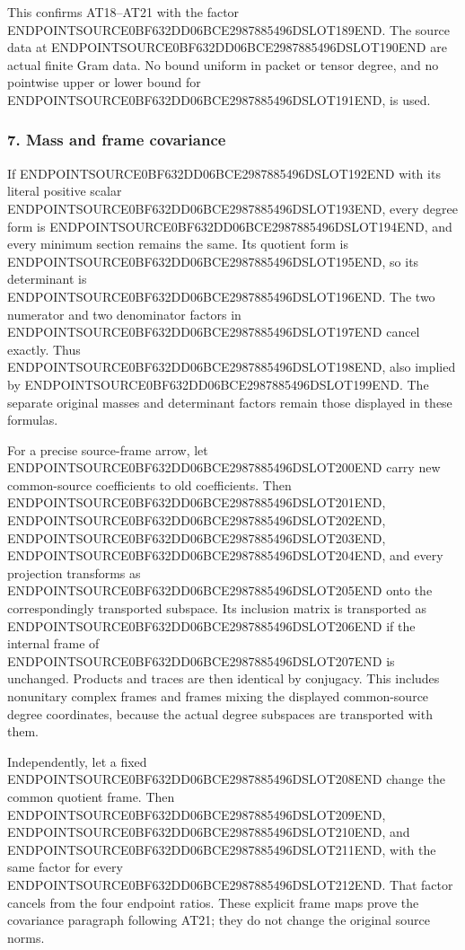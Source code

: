 This confirms AT18--AT21 with the factor ENDPOINTSOURCE0BF632DD06BCE2987885496DSLOT189END. The source data at ENDPOINTSOURCE0BF632DD06BCE2987885496DSLOT190END are actual finite Gram data. No bound uniform in packet or tensor degree, and no pointwise upper or lower bound for ENDPOINTSOURCE0BF632DD06BCE2987885496DSLOT191END, is used.

\subsubsection{7. Mass and frame covariance}\label{endpoint-determinant_review--mass-and-frame-covariance}

If ENDPOINTSOURCE0BF632DD06BCE2987885496DSLOT192END with its literal positive scalar ENDPOINTSOURCE0BF632DD06BCE2987885496DSLOT193END, every degree form is ENDPOINTSOURCE0BF632DD06BCE2987885496DSLOT194END, and every minimum section remains the same. Its quotient form is ENDPOINTSOURCE0BF632DD06BCE2987885496DSLOT195END, so its determinant is ENDPOINTSOURCE0BF632DD06BCE2987885496DSLOT196END. The two numerator and two denominator factors in ENDPOINTSOURCE0BF632DD06BCE2987885496DSLOT197END cancel exactly. Thus ENDPOINTSOURCE0BF632DD06BCE2987885496DSLOT198END, also implied by ENDPOINTSOURCE0BF632DD06BCE2987885496DSLOT199END. The separate original masses and determinant factors remain those displayed in these formulas.

For a precise source-frame arrow, let ENDPOINTSOURCE0BF632DD06BCE2987885496DSLOT200END carry new common-source coefficients to old coefficients. Then ENDPOINTSOURCE0BF632DD06BCE2987885496DSLOT201END, ENDPOINTSOURCE0BF632DD06BCE2987885496DSLOT202END, ENDPOINTSOURCE0BF632DD06BCE2987885496DSLOT203END, ENDPOINTSOURCE0BF632DD06BCE2987885496DSLOT204END, and every projection transforms as ENDPOINTSOURCE0BF632DD06BCE2987885496DSLOT205END onto the correspondingly transported subspace. Its inclusion matrix is transported as ENDPOINTSOURCE0BF632DD06BCE2987885496DSLOT206END if the internal frame of ENDPOINTSOURCE0BF632DD06BCE2987885496DSLOT207END is unchanged. Products and traces are then identical by conjugacy. This includes nonunitary complex frames and frames mixing the displayed common-source degree coordinates, because the actual degree subspaces are transported with them.

Independently, let a fixed ENDPOINTSOURCE0BF632DD06BCE2987885496DSLOT208END change the common quotient frame. Then ENDPOINTSOURCE0BF632DD06BCE2987885496DSLOT209END, ENDPOINTSOURCE0BF632DD06BCE2987885496DSLOT210END, and ENDPOINTSOURCE0BF632DD06BCE2987885496DSLOT211END, with the same factor for every ENDPOINTSOURCE0BF632DD06BCE2987885496DSLOT212END. That factor cancels from the four endpoint ratios. These explicit frame maps prove the covariance paragraph following AT21; they do not change the original source norms.

